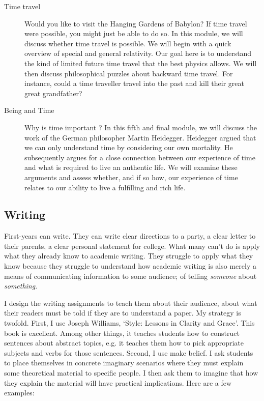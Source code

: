 \documentclass[oneside, 10pt]{article}
\begin{document}
\begin{description}
\item[Time travel] Would you like to visit the Hanging Gardens of Babylon? If time travel were possible, you might just be able to do so. In this module, we will discuss whether time travel is possible. We will begin with a quick overview of special and general relativity. Our goal here is to understand the kind of limited future time travel that the best physics allows. We will then discuss philosophical puzzles about backward time travel. For instance, could a time traveller travel into the past and kill their great great grandfather?  

\item[Being and Time] Why is time important ? In this fifth and final module, we will discuss the work of the German philosopher Martin Heidegger. Heidegger argued that we can only understand time by considering our own mortality. He subsequently argues for a close connection between our experience of time and what is required to live an authentic life. We will examine these arguments and assess whether, and if so how, our experience of time relates to our ability to live a fulfilling and rich life. 

\end{description}


\subsection*{Writing}
First-years can write. They can write clear directions to a party, a clear letter to their parents, a clear personal statement for college. What many can't do is apply what they already know to academic writing. They struggle to apply what they know because they struggle to understand how academic writing is also merely a means of communicating information to some audience; of telling \emph{someone} about \emph{something}. 

I design the writing assignments to teach them about their audience, about what their readers must be told if they are to understand a paper. My strategy is twofold. First, I use Joseph Williams, `Style: Lessons in Clarity and Grace'. This book is excellent. Among other things, it teaches students how to construct sentences about abstract topics, e.g. it teaches them how to pick appropriate subjects  and verbs for those sentences. Second, I use make belief. I ask students to place themselves in concrete imaginary scenarios where they must explain some theoretical material to specific people. I then ask them to imagine that how they explain the material will have practical implications. Here are a few examples:
\end{document}

